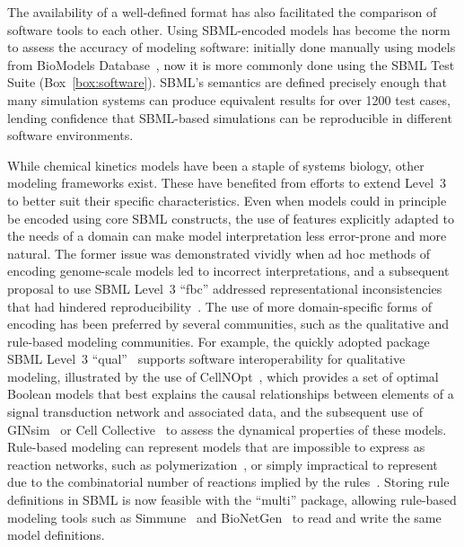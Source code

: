 \documentclass{sbml-paper}
\begin{document}
The availability of a well-defined format has also facilitated the comparison of software tools to each other.  Using SBML-encoded models has become the norm to assess the accuracy of modeling software: initially done manually using models from BioModels Database~\citep{bergmann2008comparing}, now it is more commonly done using the SBML Test Suite (Box~\ref{box:software}).  SBML's semantics are defined precisely enough that many simulation systems can produce equivalent results for over 1200 test cases, lending confidence that SBML-based simulations can be reproducible in different software environments.

While chemical kinetics models have been a staple of systems biology, other modeling frameworks exist.  These have benefited from efforts to extend Level~3 to better suit their specific characteristics.  Even when models could in principle be encoded using core SBML constructs, the use of features explicitly adapted to the needs of a domain can make model interpretation less error-prone and more natural.  The former issue was demonstrated vividly when ad hoc methods of encoding genome-scale models led to incorrect interpretations, and a subsequent proposal to use SBML Level~3 ``fbc'' addressed representational inconsistencies that had hindered reproducibility~\citep{Ebrahim2015}.  The use of more domain-specific forms of encoding has been preferred by several communities, such as the qualitative and rule-based modeling communities.  For example, the quickly adopted package SBML Level~3 ``qual''~\citep{Chaouiya2015sbml} supports software interoperability for qualitative modeling, illustrated by the use of CellNOpt~\citep{terfve2012cellnoptr}, which provides a set of optimal Boolean models that best explains the causal relationships between elements of a signal transduction network and associated data, and the subsequent use of GINsim~\citep{chaouiya2012logical} or Cell Collective~\citep{helikar2012cell} to assess the dynamical properties of these models.  Rule-based modeling can represent models that are impossible to express as reaction networks, such as polymerization~\citep{faeder2009rule}, or simply impractical to represent due to the combinatorial number of reactions implied by the rules~\citep{Hlavacek2003complexity}.  Storing rule definitions in SBML is now feasible with the ``multi'' package, allowing rule-based modeling tools such as Simmune~\citep{zhang2013simmune} and BioNetGen~\citep{faeder2009rule} to read and write the same model definitions.
\end{document}
